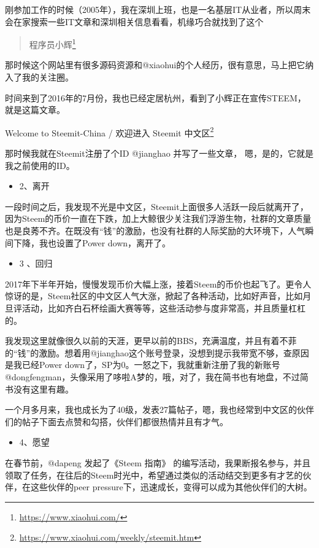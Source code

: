 \documentclass[]{ctexbook}
\providecommand{\tightlist}{%
  \setlength{\itemsep}{0pt}\setlength{\parskip}{0pt}}
\renewcommand{\href}[2]{#2\footnote{\url{#1}}}
\begin{document}
刚参加工作的时候（2005年），我在深圳上班，也是一名基层IT从业者，所以周末会在家搜索一些IT文章和深圳相关信息看看，机缘巧合就找到了这个

\begin{quote}
\href{https://www.xiaohui.com/}{程序员小辉}
\end{quote}

那时候这个网站里有很多源码资源和@xiaohui的个人经历，很有意思，马上把它纳入了我的关注圈。

时间来到了2016年的7月份，我也已经定居杭州，看到了小辉正在宣传STEEM，就是这篇文章。

\href{https://www.xiaohui.com/weekly/steemit.htm}{Welcome to Steemit-China / 欢迎进入 Steemit 中文区}

那时候我就在Steemit注册了个ID @jianghao 并写了一些文章， 嗯，是的，它就是我之前使用的ID。

\begin{itemize}
\tightlist
\item
  2、离开
\end{itemize}

一段时间之后，我发现不光是中文区，Steemit上面很多人活跃一段后就离开了，因为Steem的币价一直在下跌，加上大鲸很少关注我们浮游生物，社群的文章质量也是良莠不齐。在既没有``钱''的激励，也没有社群的人际奖励的大环境下，人气瞬间下降，我也设置了Power down，离开了。

\begin{itemize}
\tightlist
\item
  3 、回归
\end{itemize}

2017年下半年开始，慢慢发现币价大幅上涨，接着Steem的币价也起飞了。更令人惊讶的是，Steem社区的中文区人气大涨，掀起了各种活动，比如好声音，比如月旦评活动，比如齐白石杯绘画大赛等等，这些活动参与度非常高，并且质量杠杠的。

我发现这里就像很久以前的天涯，更早以前的BBS，充满温度，并且有着不菲的``钱''的激励。想着用@jianghao这个账号登录，没想到提示我带宽不够，查原因是我已经Power down了，SP为0。一怒之下，我就重新注册了我的新账号@dongfengman，头像采用了哆啦A梦的，哦，对了，我在简书也有地盘，不过简书没有这里有趣。

一个月多月来，我也成长为了40级，发表27篇帖子，嗯，我也经常到中文区的伙伴们的帖子下面去点赞和勾搭，伙伴们都很热情并且有才气。

\begin{itemize}
\tightlist
\item
  4、愿望
\end{itemize}

在春节前，@dapeng 发起了《Steem 指南》 的编写活动，我果断报名参与，并且领取了任务，在往后的Steem时光中，希望通过类似的活动结交到更多有才艺的伙伴，在这些伙伴的peer pressure下，迅速成长，变得可以成为其他伙伴们的大树。
\end{document}
